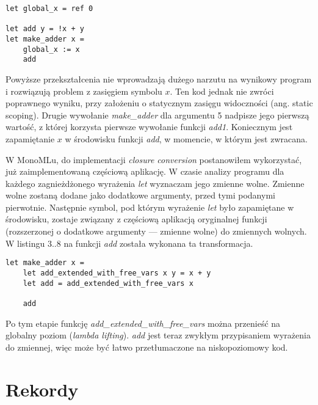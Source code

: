 \documentclass[declaration,shortabstract]{iithesis}
\begin{document}
\begin{lstlisting}[frame=single, caption={Wprowadzenie globalnej zmiennej.}]
let global_x = ref 0

let add y = !x + y 
let make_adder x = 
    global_x := x
    add 
\end{lstlisting}
Powyższe przekształcenia nie wprowadzają dużego narzutu na wynikowy program i rozwiązują 
problem z zasięgiem symbolu $x$. Ten kod jednak nie zwróci poprawnego wyniku, 
przy założeniu o statycznym zasięgu widoczności (ang. static scoping). Drugie 
wywołanie \textit{make\_adder} dla argumentu 5 nadpisze jego pierwszą wartość, 
z której korzysta pierwsze wywołanie funkcji \textit{add1}. 
Koniecznym jest zapamiętanie $x$ w środowisku funkcji 
\textit{add}, w momencie, w którym jest zwracana. 

W MonoMLu, do implementacji \textit{closure conversion} postanowiłem wykorzystać,
już zaimplementowaną częściową aplikację. W czasie analizy programu dla każdego 
zagnieżdżonego wyrażenia \textit{let} wyznaczam jego zmienne wolne. Zmienne wolne
zostaną dodane jako dodatkowe argumenty, przed tymi podanymi pierwotnie.
Następnie symbol, pod którym wyrażenie \textit{let} było zapamiętane w 
środowisku, zostaje związany z częściową aplikacją oryginalnej funkcji 
(rozszerzonej o dodatkowe argumenty --- zmienne wolne) do zmiennych wolnych.
W listingu $3..8$ na funkcji \textit{add} została wykonana ta transformacja.

\begin{lstlisting}[frame=single, caption={Wprowadzenie globalnej zmiennej.}]
let make_adder x = 
    let add_extended_with_free_vars x y = x + y
    let add = add_extended_with_free_vars x

    add
\end{lstlisting}

Po tym etapie funkcję \textit{add\_extended\_with\_free\_vars} można przenieść 
na globalny poziom (\textit{lambda lifting}). \textit{add} jest teraz zwykłym 
przypisaniem wyrażenia do zmiennej, więc może być łatwo przetłumaczone na 
niskopoziomowy kod.




\section{Rekordy}
\end{document}
